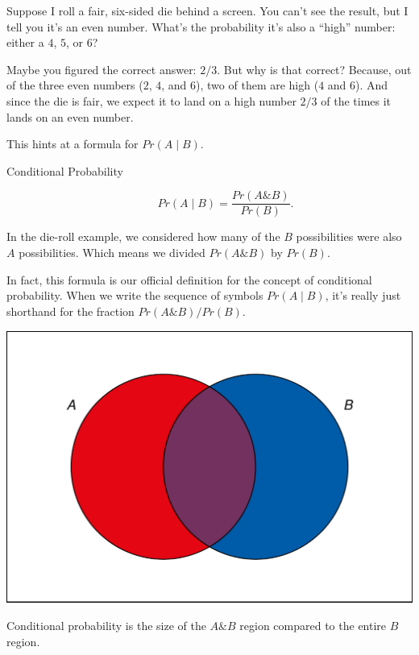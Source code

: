 \documentclass[justified]{tufte-book}
\newcommand{\given}{\mid}
\renewcommand{\wedge}{\mathbin{\&}}
\newcommand{\p}{Pr}
\theoremstyle{definition}
\theoremstyle{definition}
\theoremstyle{definition}
\theoremstyle{remark}
\begin{document}
Suppose I roll a fair, six-sided die behind a screen. You can't see the
result, but I tell you it's an even number. What's the probability it's
also a ``high'' number: either a \(4\), \(5\), or \(6\)?

Maybe you figured the correct answer: \(2/3\). But why is that correct?
Because, out of the three even numbers (\(2\), \(4\), and \(6\)), two of
them are high (\(4\) and \(6\)). And since the die is fair, we expect it
to land on a high number \(2/3\) of the times it lands on an even
number.

This hints at a formula for \(\p(A \given B)\).

\begin{description}
\item[Conditional Probability]
\[ \p(A \given B) = \frac{\p(A \wedge B)}{\p(B)}. \]
\end{description}

In the die-roll example, we considered how many of the \(B\)
possibilities were also \(A\) possibilities. Which means we divided
\(\p(A \wedge B)\) by \(\p(B)\).

In fact, this formula is our official definition for the concept of
conditional probability. When we write the sequence of symbols
\(\p(A \given B)\), it's really just shorthand for the fraction
\(\p(A \wedge B) / \p(B)\).

\begin{marginfigure}
\includegraphics{_main_files/figure-latex/condprob-1} \caption[Conditional probability is the size of the $A \wedge B$ region compared to the entire $B$ region]{Conditional probability is the size of the $A \wedge B$ region compared to the entire $B$ region.}\label{fig:condprob}
\end{marginfigure}
\end{document}
